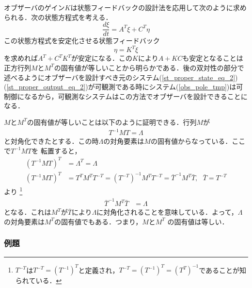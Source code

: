 オブザーバのゲイン$K$は状態フィードバックの設計法を応用して次のように求められる．次の状態方程式を考える．
\begin{equation}
 \frac{d \xi}{dt} = A^T \xi + C^T \eta
\label{obs_pole_tmp}
\end{equation}
この状態方程式を安定化させる状態フィードバック
\begin{equation}
 \eta =  K^T \xi
\end{equation}
を求めれば$A^T + C^T K^T$が安定になる．この$K$により$A + K C$も安定となることは正方行列$M$と$M^T$の固有値が等しいことから明らかである．後の双対性の部分で述べるようにオブザーバを設計すべき元のシステム(\ref{st_proper_state_eq_2})(\ref{st_proper_output_eq_2})が可観測である時にシステム(\ref{obs_pole_tmp})は可制御になるから，可観測なシステムはこの方法でオブザーバを設計できることになる．

$M$と$M^T$の固有値が等しいことは以下のように証明できる．行列$M$が
\begin{align}
   T^{-1}MT = \Lambda
\end{align}
と対角化できたとする．この時$\Lambda$の対角要素は$M$の固有値からなっている．ここで$T^{-1}MT$を
転置すると，
\begin{align}
   (T^{-1}MT)^T &=  \Lambda^T = \Lambda
\\
   (T^{-1}MT)^T &= T^T M^T T^{-T} = (T^{-T})^{-1} M^T T^{-T} = \bar{T}^{-1} M^T \bar{T}
   , \ \ \ \bar{T} = T^{-T} 
\end{align}
より
\footnote{
$T^{-T}$は$T^{-T} = (T^{-1})^T$と定義され，$T^{-T} = (T^{-1})^T=(T^T)^{-1}$であることが知られている．
}
\begin{align}
   \bar{T}^{-1} M^T \bar{T} &=  \Lambda
\end{align}
となる．これは$M^{T}$が$\bar{T}$により$\Lambda$に対角化されることを意味している．よって，$\Lambda$の対角要素は$M^{T}$の固有値でもある．つまり，$M$と$M^{T}$
の固有値は等しい．
\subsubsection{例題}

